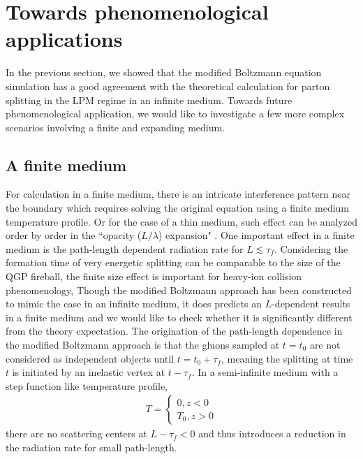 \documentclass[aps, prc, reprint, amsmath, groupedaddress, nofootinbib]{revtex4-1}
\begin{document}
\section{Towards phenomenological applications}\label{section:more}
In the previous section, we showed that the modified Boltzmann equation simulation has a good agreement with the theoretical calculation for parton splitting in the LPM regime in an infinite medium.
Towards future phenomenological application, we would like to investigate a few more complex scenarios involving a finite and expanding medium.

\subsection{A finite medium}
For calculation in a finite medium, there is an intricate interference pattern near the boundary which requires solving the original equation using a finite medium temperature profile. 
Or for the case of a thin medium, such effect can be analyzed order by order in the ``opacity ($L/\lambda$) expansion" \cite{Wiedemann:2000za,Gyulassy:1999zd}. 
One important effect in a finite medium is the path-length dependent radiation rate for $L \lesssim \tau_f$. Considering the formation time of very energetic splitting can be comparable to the size of the QGP fireball, the finite size effect is important for heavy-ion collision phenomenology,
Though the modified Boltzmann approach has been constructed to mimic the case in an infinite medium, it does predicts an $L$-dependent results in a finite medium and we would like to check whether it is significantly different from the theory expectation.
The origination of the path-length dependence in the modified Boltzmann approach is that the gluons sampled at $t=t_0$ are not considered as independent objects until $t = t_0+\tau_f$, meaning the splitting at time $t$ is initiated by an inelastic vertex at $t-\tau_f$.
In a semi-infinite medium with a step function like temperature profile, 
\begin{eqnarray}
T = \begin{cases}
0 , z<0\\
T_0, z>0
\end{cases}
\end{eqnarray}
there are no scattering centers at $L-\tau_f<0$ and thus introduces a reduction in the radiation rate for small path-length.
\end{document}

